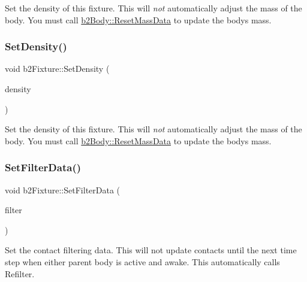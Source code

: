 Set the density of this fixture. This will {\itshape not} automatically adjust the mass of the body. You must call \hyperlink{classb2Body_a109d8567c6ae84c61fce2919fb209c63}{b2\+Body\+::\+Reset\+Mass\+Data} to update the body\textquotesingle{}s mass. \mbox{\label{classb2Fixture_ad4e1d9323103975c8931d022b952d04a}} 
\subsubsection{\texorpdfstring{Set\+Density()}{SetDensity()}\hspace{0.1cm}{\footnotesize\ttfamily [2/2]}}
{\footnotesize\ttfamily void b2\+Fixture\+::\+Set\+Density (\begin{DoxyParamCaption}\item[{float32}]{density }\end{DoxyParamCaption})}

Set the density of this fixture. This will {\itshape not} automatically adjust the mass of the body. You must call \hyperlink{classb2Body_a109d8567c6ae84c61fce2919fb209c63}{b2\+Body\+::\+Reset\+Mass\+Data} to update the body\textquotesingle{}s mass. \mbox{\label{classb2Fixture_a2c5e0d12c174927a4ad550459be334ad}} 
\subsubsection{\texorpdfstring{Set\+Filter\+Data()}{SetFilterData()}\hspace{0.1cm}{\footnotesize\ttfamily [1/2]}}
{\footnotesize\ttfamily void b2\+Fixture\+::\+Set\+Filter\+Data (\begin{DoxyParamCaption}\item[{const \hyperlink{structb2Filter}{b2\+Filter} \&}]{filter }\end{DoxyParamCaption})}

Set the contact filtering data. This will not update contacts until the next time step when either parent body is active and awake. This automatically calls Refilter. \mbox{\label{classb2Fixture_a2c5e0d12c174927a4ad550459be334ad}} 
